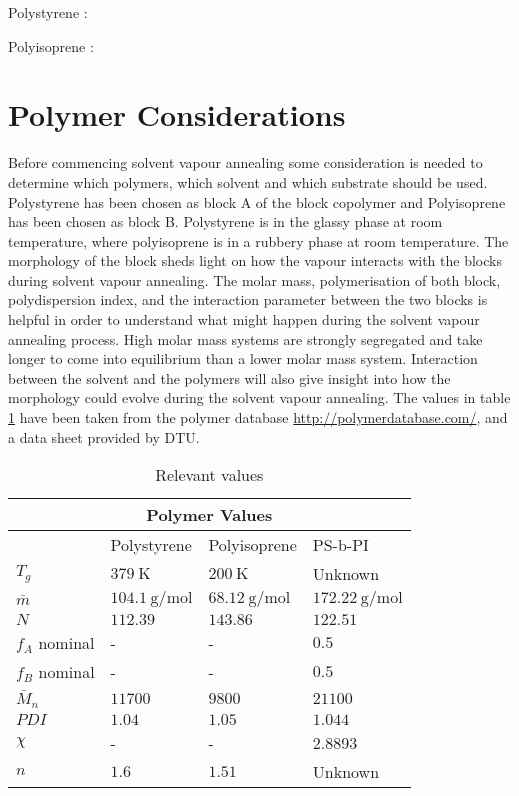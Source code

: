 \documentclass[MasterThesisMain.tex]{subfiles}
\begin{document}
\setpolymerdelim[]
Polystyrene :
\bigskip


\setpolymerdelim[]
Polyisoprene :


\section{Polymer Considerations}
Before commencing solvent vapour annealing some consideration is needed to determine which polymers, which solvent and which substrate should be used. Polystyrene has been chosen as block A of the block copolymer and Polyisoprene has been chosen as block B. Polystyrene is in the glassy phase at room temperature, where polyisoprene is in a rubbery phase at room temperature. The morphology of the block sheds light on how the vapour interacts with the blocks during solvent vapour annealing. The molar mass, polymerisation of both block, polydispersion index, and the interaction parameter between the two blocks is helpful in order to understand what might happen during the solvent vapour annealing process. High molar mass systems are strongly segregated and take longer to come into equilibrium than a lower molar mass system. Interaction between the solvent and the polymers will also give insight into how the morphology could evolve during the solvent vapour annealing. The values in table \ref{tab:relval} have been taken from the polymer database \url{http://polymerdatabase.com/}, and a data sheet provided by DTU.

\begin{table}
	\caption{Relevant values}
\begin{tabular}{ |p{3cm}||p{3cm}|p{3cm}|p{3cm}|  }
 \hline
 \multicolumn{4}{|c|}{Polymer Values} \\
 \hline
    & Polystyrene & Polyisoprene & PS-b-PI\\
 \hline
 $T_g$& $\SI{379}{\kelvin}$   & $\SI{200}{\kelvin}$  & Unknown   \\
 $\bar{m}$ & $\SI{104.1}{\gram\per\mole}$ &$\SI{68.12}{\gram\per\mole}$  &$\SI{172.22}{\gram\per\mole}$  \\
 $N$& $112.39$  & $143.86$  & $122.51$  \\
 $f_A$ nominal& -  & -  & $0.5$  \\
 $f_B$ nominal& -  & -  & $0.5$  \\
 $\bar{M}_n$& $11700$  & $9800$  & $21100$  \\
 $PDI$& $1.04$  & $1.05$  & $1.044$  \\
 $\chi$& - & - & 2.8893  \\
 $n$& $1.6$ & $1.51$ & Unknown\\
 \hline
\end{tabular}
\label{tab:relval}
\end{table}
\end{document}
